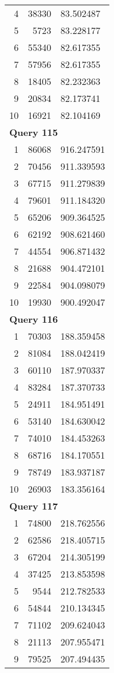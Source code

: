\begin{longtable}[{p}]{@{}rrp{}@{}}
4 & 38330 & 83.502487 \\
5 & 5723 & 83.228177 \\
6 & 55340 & 82.617355 \\
7 & 57956 & 82.617355 \\
8 & 18405 & 82.232363 \\
9 & 20834 & 82.173741 \\
10 & 16921 & 82.104169 \\
\midrule
\multicolumn{3}{l}{\bfseries Query 115} \\
1 & 86068 & 916.247591 \\
2 & 70456 & 911.339593 \\
3 & 67715 & 911.279839 \\
4 & 79601 & 911.184320 \\
5 & 65206 & 909.364525 \\
6 & 62192 & 908.621460 \\
7 & 44554 & 906.871432 \\
8 & 21688 & 904.472101 \\
9 & 22584 & 904.098079 \\
10 & 19930 & 900.492047 \\
\midrule
\multicolumn{3}{l}{\bfseries Query 116} \\
1 & 70303 & 188.359458 \\
2 & 81084 & 188.042419 \\
3 & 60110 & 187.970337 \\
4 & 83284 & 187.370733 \\
5 & 24911 & 184.951491 \\
6 & 53140 & 184.630042 \\
7 & 74010 & 184.453263 \\
8 & 68716 & 184.170551 \\
9 & 78749 & 183.937187 \\
10 & 26903 & 183.356164 \\
\midrule
\multicolumn{3}{l}{\bfseries Query 117} \\
1 & 74800 & 218.762556 \\
2 & 62586 & 218.405715 \\
3 & 67204 & 214.305199 \\
4 & 37425 & 213.853598 \\
5 & 9544 & 212.782533 \\
6 & 54844 & 210.134345 \\
7 & 71102 & 209.624043 \\
8 & 21113 & 207.955471 \\
9 & 79525 & 207.494435 \\

\end{longtable}
